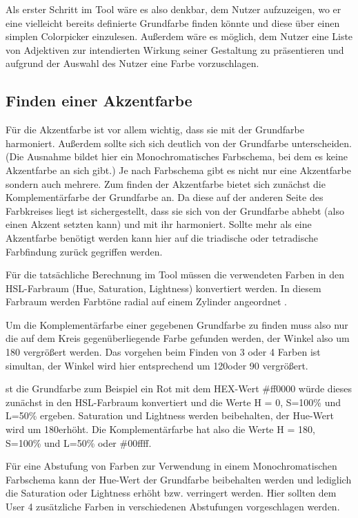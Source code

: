 Als erster Schritt im Tool wäre es also denkbar, dem Nutzer aufzuzeigen, wo er eine vielleicht bereits definierte Grundfarbe finden könnte und diese über einen simplen Colorpicker einzulesen.
Außerdem wäre es möglich, dem Nutzer eine Liste von Adjektiven zur intendierten Wirkung seiner Gestaltung zu präsentieren und aufgrund der Auswahl des Nutzer eine Farbe vorzuschlagen.

\subsection{Finden einer Akzentfarbe}

Für die Akzentfarbe ist vor allem wichtig, dass sie mit der Grundfarbe harmoniert. Außerdem sollte sich sich deutlich von der Grundfarbe unterscheiden. (Die Ausnahme bildet hier ein Monochromatisches Farbschema, bei dem es keine Akzentfarbe an sich gibt.) Je nach Farbschema gibt es nicht nur eine Akzentfarbe sondern auch mehrere.
Zum finden der Akzentfarbe bietet sich zunächst die Komplementärfarbe der Grundfarbe an. Da diese auf der anderen Seite des Farbkreises liegt ist sichergestellt, dass sie sich von der Grundfarbe abhebt (also einen Akzent setzten kann) und mit ihr harmoniert. Sollte mehr als eine Akzentfarbe benötigt werden kann hier auf die triadische oder tetradische Farbfindung zurück gegriffen werden.

Für die tatsächliche Berechnung im Tool müssen die verwendeten Farben in den HSL-Farbraum (Hue, Saturation, Lightness) konvertiert werden. In diesem Farbraum werden Farbtöne radial auf einem Zylinder angeordnet \cite{joblove1978color}.

Um die Komplementärfarbe einer gegebenen Grundfarbe zu finden muss also nur die auf dem Kreis gegenüberliegende Farbe gefunden werden, der Winkel also um 180 \degree vergrößert werden. Das vorgehen beim Finden von 3 oder 4 Farben ist simultan, der Winkel wird hier entsprechend um 120\degree oder 90 \degree vergrößert.

st die Grundfarbe zum Beispiel ein Rot mit dem HEX-Wert \#ff0000 würde dieses zunächst in den HSL-Farbraum konvertiert und die Werte H = 0\degree, S=100\% und L=50\% ergeben. Saturation und Lightness werden beibehalten, der Hue-Wert wird um 180\degree erhöht. Die Komplementärfarbe hat also die Werte  H = 180\degree, S=100\% und L=50\% oder \#00ffff.

Für eine Abstufung von Farben zur Verwendung in einem Monochromatischen Farbschema kann der Hue-Wert der Grundfarbe beibehalten werden und lediglich die Saturation oder Lightness erhöht bzw. verringert werden. Hier sollten dem User 4 zusätzliche Farben in verschiedenen Abstufungen vorgeschlagen werden.

